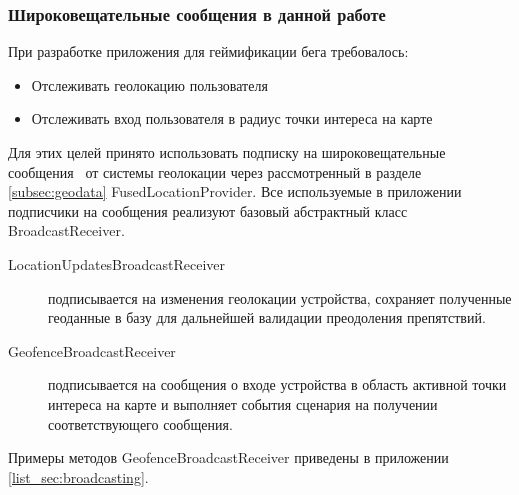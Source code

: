 \subsubsection*{Широковещательные сообщения в данной работе}
При разработке приложения для геймификации бега требовалось:
\begin{itemize}
	\item Отслеживать геолокацию пользователя
	\item Отслеживать вход пользователя в радиус точки интереса на карте
\end{itemize}
\smallskip
Для этих целей принято использовать подписку на широковещательные сообщения~\autocite{android_broasdcast} от системы геолокации через рассмотренный в разделе \ref{subsec:geodata} FusedLocationProvider.
Все используемые в приложении подписчики на сообщения реализуют базовый абстрактный класс BroadcastReceiver.
\begin{description}
	\item[LocationUpdatesBroadcastReceiver] подписывается на изменения геолокации устройства, сохраняет полученные геоданные в базу для дальнейшей валидации преодоления препятствий.
	\item[GeofenceBroadcastReceiver] подписывается на сообщения о входе устройства в область активной точки интереса на карте и выполняет события сценария на получении соответствующего сообщения.
\end{description}
\smallskip
Примеры методов GeofenceBroadcastReceiver приведены в приложении \ref{list_sec:broadcasting}.